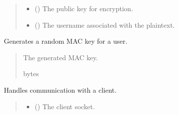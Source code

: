 \documentclass[letterpaper,10pt,english]{sphinxmanual}
\begin{document}
\begin{fulllineitems}
\begin{fulllineitems}
\begin{quote}
\begin{description}
\begin{itemize}
\item {} 
\sphinxAtStartPar
{} () \textendash{} The public key for encryption.

\item {} 
\sphinxAtStartPar
{} () \textendash{} The username associated with the plaintext.

\end{itemize}

\end{description}\end{quote}

\end{fulllineitems}


\begin{fulllineitems}
\label{\detokenize{server1:server1.Server.generate_user_mac_key}}
\pysigstartsignatures
{}
\pysigstopsignatures
\sphinxAtStartPar
Generates a random MAC key for a user.
\begin{quote}\begin{description}
\sphinxAtStartPar
The generated MAC key.

\sphinxAtStartPar
bytes

\end{description}\end{quote}

\end{fulllineitems}


\begin{fulllineitems}
\label{\detokenize{server1:server1.Server.handle_client}}
\pysigstartsignatures
{}
\pysigstopsignatures
\sphinxAtStartPar
Handles communication with a client.
\begin{quote}\begin{description}
\begin{itemize}
\item {} 
\sphinxAtStartPar
{} () \textendash{} The client socket.


\end{itemize}
\end{description}
\end{quote}
\end{fulllineitems}
\end{fulllineitems}
\end{document}
